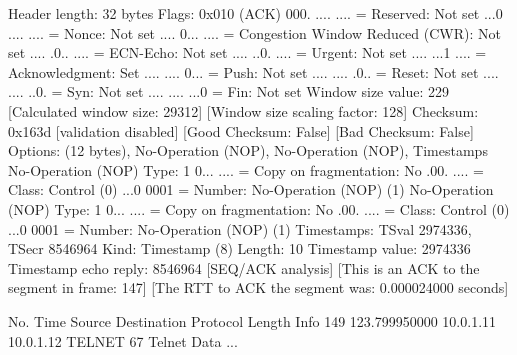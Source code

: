     Header length: 32 bytes
    Flags: 0x010 (ACK)
        000. .... .... = Reserved: Not set
        ...0 .... .... = Nonce: Not set
        .... 0... .... = Congestion Window Reduced (CWR): Not set
        .... .0.. .... = ECN-Echo: Not set
        .... ..0. .... = Urgent: Not set
        .... ...1 .... = Acknowledgment: Set
        .... .... 0... = Push: Not set
        .... .... .0.. = Reset: Not set
        .... .... ..0. = Syn: Not set
        .... .... ...0 = Fin: Not set
    Window size value: 229
    [Calculated window size: 29312]
    [Window size scaling factor: 128]
    Checksum: 0x163d [validation disabled]
        [Good Checksum: False]
        [Bad Checksum: False]
    Options: (12 bytes), No-Operation (NOP), No-Operation (NOP), Timestamps
        No-Operation (NOP)
            Type: 1
                0... .... = Copy on fragmentation: No
                .00. .... = Class: Control (0)
                ...0 0001 = Number: No-Operation (NOP) (1)
        No-Operation (NOP)
            Type: 1
                0... .... = Copy on fragmentation: No
                .00. .... = Class: Control (0)
                ...0 0001 = Number: No-Operation (NOP) (1)
        Timestamps: TSval 2974336, TSecr 8546964
            Kind: Timestamp (8)
            Length: 10
            Timestamp value: 2974336
            Timestamp echo reply: 8546964
    [SEQ/ACK analysis]
        [This is an ACK to the segment in frame: 147]
        [The RTT to ACK the segment was: 0.000024000 seconds]

No.     Time           Source                Destination           Protocol Length Info
    149 123.799950000  10.0.1.11             10.0.1.12             TELNET   67     Telnet Data ...

